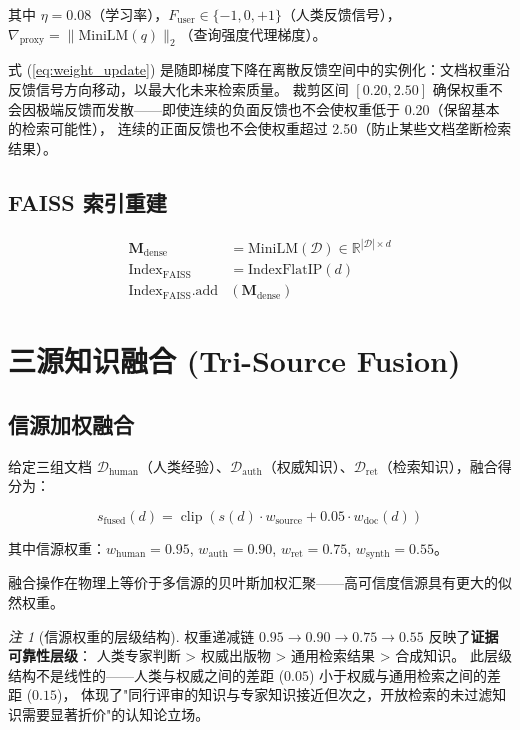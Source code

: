 \documentclass[11pt,a4paper]{ctexart}
\theoremstyle{remark}
\newtheorem{remark}{注}[section]
\DeclareMathOperator{\clip}{clip}
\begin{document}
其中 $\eta = 0.08$（学习率），$F_{\text{user}} \in \{-1, 0, +1\}$（人类反馈信号），$\nabla_{\text{proxy}} = \|\text{MiniLM}(q)\|_2$（查询强度代理梯度）。

式 (\ref{eq:weight_update}) 是随即梯度下降在离散反馈空间中的实例化：文档权重沿反馈信号方向移动，以最大化未来检索质量。
裁剪区间 $[0.20, 2.50]$ 确保权重不会因极端反馈而发散——即使连续的负面反馈也不会使权重低于 0.20（保留基本的检索可能性），
连续的正面反馈也不会使权重超过 2.50（防止某些文档垄断检索结果）。

\subsection{FAISS 索引重建}

\begin{align}
\mathbf{M}_{\text{dense}} &= \text{MiniLM}(\mathcal{D}) \in \mathbb{R}^{|\mathcal{D}| \times d} \\
\text{Index}_{\text{FAISS}} &= \text{IndexFlatIP}(d) \\
\text{Index}_{\text{FAISS}}.\text{add}&(\mathbf{M}_{\text{dense}})
\end{align}

\section{三源知识融合 (Tri-Source Fusion)}

\subsection{信源加权融合}

给定三组文档 $\mathcal{D}_{\text{human}}$（人类经验）、$\mathcal{D}_{\text{auth}}$（权威知识）、$\mathcal{D}_{\text{ret}}$（检索知识），融合得分为：

\begin{equation}
s_{\text{fused}}(d) = \clip\left(s(d) \cdot w_{\text{source}} + 0.05 \cdot w_{\text{doc}}(d)\right)
\end{equation}

其中信源权重：$w_{\text{human}} = 0.95$, $w_{\text{auth}} = 0.90$, $w_{\text{ret}} = 0.75$, $w_{\text{synth}} = 0.55$。

融合操作在物理上等价于多信源的贝叶斯加权汇聚——高可信度信源具有更大的似然权重。

\begin{remark}[信源权重的层级结构]
权重递减链 $0.95 \to 0.90 \to 0.75 \to 0.55$ 反映了\textbf{证据可靠性层级}：
人类专家判断 > 权威出版物 > 通用检索结果 > 合成知识。
此层级结构不是线性的——人类与权威之间的差距 ($0.05$) 小于权威与通用检索之间的差距 ($0.15$)，
体现了"同行评审的知识与专家知识接近但次之，开放检索的未过滤知识需要显著折价"的认知论立场。
\end{remark}
\end{document}
